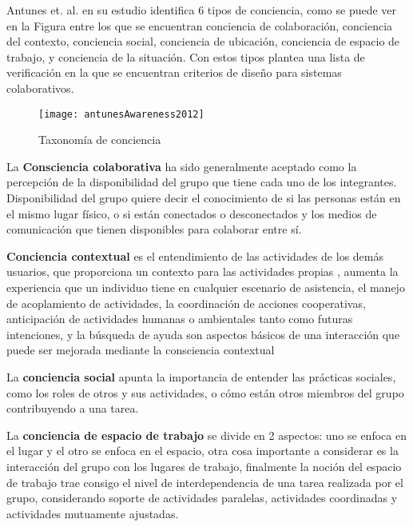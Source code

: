 Antunes et. al. en su estudio \citep{antunes2014reviewing} identifica 6 tipos de conciencia, como se puede ver en la Figura entre los que se encuentran conciencia de colaboraci\'on, conciencia del contexto, conciencia social, conciencia de ubicaci\'on, conciencia de espacio de trabajo, y conciencia de la situaci\'on. Con estos tipos plantea una lista de verificaci\'on en la que se encuentran criterios de dise\~no para sistemas colaborativos.

\begin{figure}[h!]
  \centering
    \texttt{[image: antunesAwareness2012]}
  \caption{Taxonom\'ia de conciencia \citep{antunes2014reviewing}}
  \label{awareness:taxonomy}
\end{figure}

La \textbf{Consciencia colaborativa} ha sido generalmente aceptado como la percepci\'on de la disponibilidad del grupo que tiene cada uno de los integrantes. Disponibilidad del grupo quiere decir el conocimiento de si las personas est\'an en el mismo lugar f\'isico, o si est\'an conectados o desconectados y los medios de comunicaci\'on que tienen disponibles para colaborar entre s\'i.

\textbf{Conciencia contextual} es el entendimiento de las actividades de los dem\'as usuarios, que proporciona un contexto para las actividades propias \citep{dourish1992awareness}, aumenta la experiencia que un individuo tiene en cualquier escenario de asistencia, el manejo de acoplamiento de actividades, la coordinaci\'on de acciones cooperativas, anticipaci\'on de actividades humanas o ambientales tanto como futuras intenciones, y la b\'usqueda de ayuda son aspectos b\'asicos de una interacci\'on que puede ser mejorada mediante la consciencia contextual \citep{aehnelt2012discussion}

La \textbf{conciencia social} apunta la importancia de entender las pr\'acticas sociales, como los roles de otros y sus actividades, o c\'omo est\'an otros miembros del grupo contribuyendo a una tarea\citep{antunes2014reviewing}.

La \textbf{conciencia de espacio de trabajo} se divide en 2 aspectos: uno se enfoca en el lugar y el otro se enfoca en el espacio, otra cosa importante a considerar es la interacci\'on del grupo con los lugares de trabajo, finalmente la noci\'on del espacio de trabajo trae consigo el nivel de interdependencia de una tarea realizada por el grupo, considerando soporte de actividades paralelas, actividades coordinadas y actividades mutuamente ajustadas.

